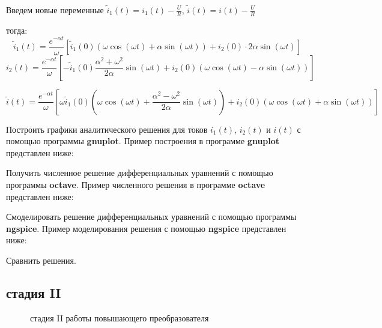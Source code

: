 \documentclass[a4paper,12pt]{article}
\begin{document}
Введем новые переменные ${\displaystyle \tilde{i}_1(t) = i_1(t) - \frac{U}{R}}$,
${\displaystyle \tilde{i}(t) = i(t) - \frac{U}{R}}$

тогда:
$$
\tilde{i}_1(t) = \frac{e^{-\alpha t}}{\omega} \left[ \tilde{i}_1(0) 
\left(\omega\cos(\omega t) + \alpha \sin(\omega t)\right)
+ i_2(0)\cdot 2\alpha \sin(\omega t) \right]
$$
$$
i_2(t)=\frac{e^{-\alpha t}}{\omega}
\left[ -\tilde{i}_1(0) \frac{\alpha^2+\omega^2}{2\alpha}\sin(\omega t) +
i_2(0) \left(\omega \cos(\omega t) - \alpha\sin(\omega t)\right)
\right]
$$

$$
\tilde{i}(t) = \frac{e^{-\alpha t}}{\omega} 
\left[
\omega	\tilde{i}_1(0)\left(\omega\cos(\omega t) + \frac{\alpha^2 - \omega^2}{2\alpha}\sin(\omega t) \right)
+ i_2(0)\left(\omega\cos(\omega t)  + \alpha\sin(\omega t)\right)
\right]
$$



Построить графики аналитического решения для токов $i_1(t)$, $i_2(t)$ и $i(t)$ с помощью программы {\bf gnuplot}. Пример построения в программе {\bf gnuplot}
представлен ниже:



Получить численное решение дифференциальных уравнений с помощью программы {\bf octave}. Пример численного решения в программе {\bf octave} представлен ниже:



Смоделировать решение дифференциальных уравнений с помощью программы {\bf ngspice}. Пример моделирования решения с помощью {\bf ngspice} представлен ниже:



Сравнить решения.

\subsection{стадия II}
\begin{figure}[!ht]
\centering
{}
\caption{стадия II работы повышающего преобразователя}
\end{figure}
\end{document}

